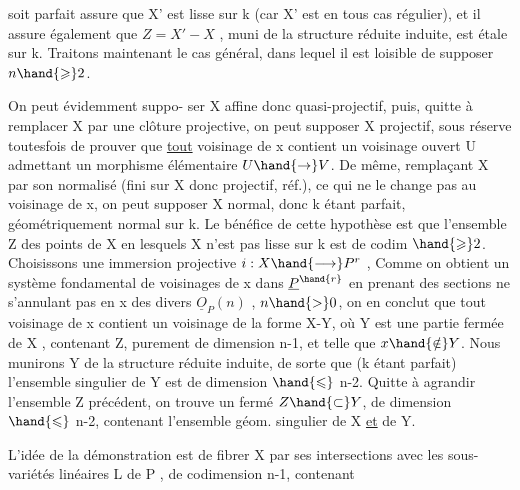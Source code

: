 
 soit parfait assure que X' est lisse sur k (car X' est en tous cas
régulier), et il assure également que $Z = X' - X$ , muni de la structure
réduite induite, est étale sur k. Traitons maintenant le cas général,
dans lequel il est loisible de supposer $n \hand{\geqslant} 2$.

 On peut évidemment suppo-%
ser X  affine donc quasi-projectif, puis, quitte à remplacer X
par une clôture projective, on peut supposer X projectif, sous réserve
toutesfois de prouver que \uline{tout} voisinage de x contient un voisinage
ouvert U admettant un morphisme élémentaire $U \hand{\to} V$. De même, remplaçant
X par son normalisé (fini sur X donc projectif, réf.), ce qui ne le
change pas au voisinage de x, on peut supposer X normal, donc k étant
parfait, géométriquement normal sur k.  Le
bénéfice de cette hypothèse est que l'ensemble Z des points de X en
lesquels X n'est pas lisse sur k est de codim $\hand{\geqslant} 2$. 
Choisissons une immersion projective $i : X \hand{\longrightarrow} P^r$ , 
 Comme on obtient un système
fondamental de voisinages de x dans $\underline{P}^{\hand{r}}$ en prenant des sections ne
s'annulant pas en x des divers $\underline{O}_P(n)$ , $n \hand{>} 0$, on en conclut que tout
voisinage de x contient un voisinage de la forme X-Y, où Y est une
partie fermée de X , contenant Z, purement de dimension n-1, et telle que
$x \hand{\notin} Y$. Nous munirons Y de la structure réduite induite, de sorte que
(k étant parfait) l'ensemble singulier de Y est de dimension $\hand{\leqslant}$ n-2. \placedmargin{\unsure{$\nearrow$}}
Quitte à agrandir l'ensemble Z précédent, on trouve un fermé $Z \hand{\subset} Y$, de
dimension $\hand{\leqslant}$ n-2, contenant l'ensemble géom. singulier de X \uline{et} de Y.

L'idée de la démonstration est de fibrer X par ses intersections
avec les sous-variétés linéaires L de P , de codimension n-1, contenant

